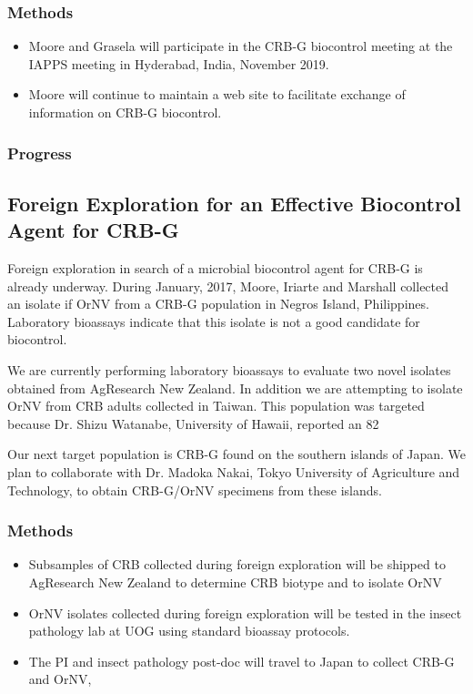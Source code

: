 \documentclass[12pt,letterpaper,english,bibliography=totocnumbered,abstract=on]{scrartcl}
\begin{document}
\subsubsection{Methods}

\begin{itemize}
    \item Moore and Grasela will participate in the CRB-G biocontrol meeting at the IAPPS meeting in Hyderabad, India, November 2019.
    \item Moore will continue to maintain a web site to facilitate exchange of information on CRB-G biocontrol.
\end{itemize}

\subsubsection{Progress}


\subsection{Foreign Exploration for an Effective Biocontrol Agent for CRB-G}

Foreign exploration in search of a microbial biocontrol agent for CRB-G is already underway. During January, 2017, Moore, Iriarte and Marshall collected an isolate if OrNV from a CRB-G population in Negros Island, Philippines. Laboratory bioassays indicate that this isolate is not a good candidate for biocontrol.

We are currently performing laboratory bioassays to evaluate two novel isolates obtained from AgResearch New Zealand. In addition we are attempting to isolate OrNV from CRB adults collected in Taiwan. This population was targeted because Dr. Shizu Watanabe, University of Hawaii, reported an 82%

Our next target population is CRB-G found on the southern islands of Japan. We plan to collaborate with Dr. Madoka Nakai, Tokyo University of Agriculture and Technology, to obtain CRB-G/OrNV specimens from these islands.

\subsubsection{Methods}

\begin{itemize}
	\item Subsamples of CRB collected during foreign exploration will be shipped to AgResearch New Zealand to determine CRB biotype and to isolate OrNV
	\item OrNV isolates collected during foreign exploration will be tested in the insect pathology lab at UOG using standard bioassay protocols.
	\item The PI and insect pathology post-doc will travel to Japan to collect CRB-G and OrNV, 
\end{itemize}
\end{document}
